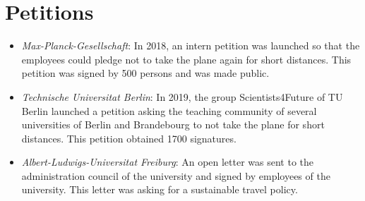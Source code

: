 \documentclass[version=3.21, pagesize, twoside=off, bibliography=totoc, DIV=calc, fontsize=12pt, a4paper, french, english]{scrartcl}
\begin{document}
\section{Petitions} 
\begin{itemize}
\item \emph{Max-Planck-Gesellschaft}: In 2018, an intern petition was launched so that the employees could pledge not to take the plane again for short distances. This petition was signed by 500 persons and was made public. 
\item \emph{Technische Universitat Berlin}: In 2019, the group Scientists4Future of TU Berlin launched a petition asking the teaching community of several universities of Berlin and Brandebourg to not take the plane for short distances. This petition obtained 1700 signatures.
\item \emph{Albert-Ludwigs-Universitat Freiburg}: An open letter was sent to the administration council of the university and signed by employees of the university. This letter was asking for a sustainable travel policy. 
\end{itemize}
\end{document}
